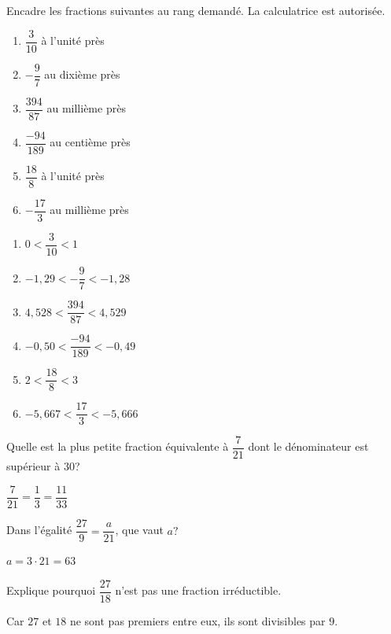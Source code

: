 \documentclass[../math2.tex]{subfiles}
\begin{document}
\begin{exercise}
  Encadre les fractions suivantes au rang demandé. La calculatrice est autorisée.
  \begin{enumerate}[cols=2]
    \item $\dfrac{3}{10}$ à l'unité près
    \item $- \dfrac{9}{7}$ au dixième près
    \item $\dfrac{394}{87}$ au millième près
    \item $\dfrac{- 94}{189}$ au centième près
    \item $\dfrac{18}{8}$ à l'unité près
    \item $-\dfrac{17}{3}$ au millième près
  \end{enumerate}
\end{exercise}
\begin{solution}
  \begin{enumerate}
    \item $0<\dfrac{3}{10}<1$
    \item $-1,29<-\dfrac{9}{7}<-1,28$
    \item $4,528 < \dfrac{394}{87} < 4,529$
    \item $-0,50<\dfrac{-94}{189}<-0,49$
    \item $2<\dfrac{18}{8}<3$
    \item $-5,667<\dfrac{17}{3}<-5,666$
  \end{enumerate}
\end{solution}

\begin{exercise}
  Quelle est la plus petite fraction équivalente à $\dfrac{7}{21}$ dont le dénominateur est supérieur à $30$?
\end{exercise}
\begin{solution}
  $\dfrac{7}{21} = \dfrac{1}{3} = \dfrac{11}{33}$
\end{solution}

\begin{exercise}
  Dans l'égalité $\dfrac{27}{9} = \dfrac{a}{21}$, que vaut $a?$
\end{exercise}
\begin{solution}
  $a=3\cdot 21=63$
\end{solution}

\begin{exercise}
  Explique pourquoi $\dfrac{27}{18}$ n'est pas une fraction
  irréductible.
\end{exercise}
\begin{solution}
  Car $27$ et $18$ ne sont pas premiers entre eux, ils sont divisibles par $9$.
\end{solution}
\end{document}

